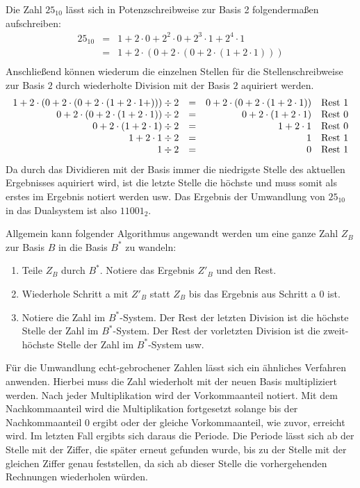 \documentclass[11pt,a4paper]{scrreprt}
\begin{document}
Die Zahl $25_{10}$ lässt sich in Potenzschreibweise zur Basis 2 folgendermaßen aufschreiben:
\begin{eqnarray*}
	25_{10} & = & 1 + 2 \cdot 0 + 2^2 \cdot 0 
		+ 2^3 \cdot 1 + 2^4 \cdot 1 \\
	& = & 1 + 2 \cdot (0 + 2 \cdot (0 
		+ 2 \cdot (1 + 2 \cdot 1))) \\
\end{eqnarray*}
Anschließend können wiederum die einzelnen Stellen für die Stellenschreibweise zur Basis $2$ durch wiederholte Division mit der Basis $2$ aquiriert werden.
$$
\begin{array}{rrrl}
	1 + 2 \cdot (0 + 2 \cdot (0 + 2 \cdot (1 + 2 \cdot 1 + ))) \div 2 
		& = & 0 + 2 \cdot (0 + 2 \cdot (1 + 2 \cdot 1)) 
		& \textnormal{Rest } 1\\
		0 + 2 \cdot (0 + 2 \cdot (1 + 2 \cdot 1)) \div 2
		& = & 0 + 2 \cdot (1 + 2 \cdot 1) 
		& \textnormal{Rest } 0\\
		0 + 2 \cdot (1 + 2 \cdot 1) \div 2
		& = & 1 + 2 \cdot 1 
		& \textnormal{Rest } 0\\
		1 + 2 \cdot 1 \div 2
		& = & 1 
		& \textnormal{Rest } 1\\
		1 \div 2
		& = & 0 
		& \textnormal{Rest } 1\\
\end{array}
$$
Da durch das Dividieren mit der Basis immer die niedrigste Stelle des aktuellen Ergebnisses aquiriert wird, ist die letzte Stelle die höchste und muss somit als erstes im Ergebnis notiert werden usw. Das Ergebnis der Umwandlung von $25_{10}$ in das Dualsystem ist also $11001_2$.

Allgemein kann folgender Algorithmus angewandt werden um eine ganze Zahl $Z_B$ zur Basis $B$ in die Basis $B^*$ zu wandeln:
\begin{enumerate}
\renewcommand{\labelenumi}{\alph{enumi})}
\item
Teile $Z_B$ durch $B^*$. Notiere das Ergebnis $Z'_B$ und den Rest. 

\item
Wiederhole Schritt a mit $Z'_B$ statt $Z_B$ bis das Ergebnis aus Schritt a $0$ ist.

\item
Notiere die Zahl im $B^*$-System. Der Rest der letzten Division ist die höchste Stelle der Zahl im $B^*$-System. Der Rest der vorletzten Division ist die zweit-höchste Stelle der Zahl im $B^*$-System usw.
\end{enumerate}

Für die Umwandlung echt-gebrochener Zahlen lässt sich ein ähnliches Verfahren anwenden. Hierbei muss die Zahl wiederholt mit der neuen Basis multipliziert werden. Nach jeder Multiplikation wird der Vorkommaanteil notiert. Mit dem Nachkommaanteil wird die Multiplikation fortgesetzt solange bis der Nachkommaanteil $0$ ergibt oder der gleiche Vorkommaanteil, wie zuvor, erreicht wird. Im letzten Fall ergibts sich daraus die Periode. Die Periode lässt sich ab der Stelle mit der Ziffer, die später erneut gefunden wurde, bis zu der Stelle mit der gleichen Ziffer genau feststellen, da sich ab dieser Stelle die vorhergehenden Rechnungen wiederholen würden.
\end{document}
